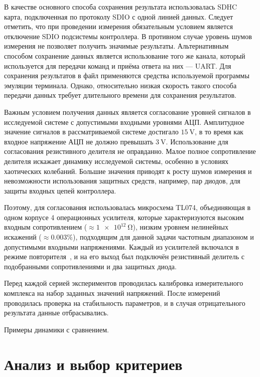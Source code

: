 В качестве основного способа сохранения результата
использовалась SDHC карта, подключенная по протоколу SDIO с одной линией данных.
Следует отметить, что при проведении измерения обязательным условием
является отключение SDIO подсистемы контроллера.
В противном случае уровень шумов измерения не позволяет
получить значимые результаты.
Альтернативным способом сохранение данных является
использование того же канала, который используется для передачи команд
и приёма ответа на них --- UART. Для сохранения результатов в файл
применяются средства используемой программы эмуляции терминала.
Однако, относительно низкая скорость такого способа передачи данных
требует длительного времени для сохранения результатов.

Важным условием получения данных является согласование уровней
сигналов в исследуемой системе с допустимыми входными уровнями АЦП.
Амплитудное значение сигналов в рассматриваемой системе достигало
$\SI{15}{\volt}$, в то время как входное напряжение АЦП не должно
превышать $\SI{3}{\volt}$.
Использование для согласования резистивного делителя
не оправданно. Малое полное сопротивление делителя
искажает динамику исследуемой системы, особенно в условиях
хаотических колебаний. Большие значения приводят
к росту шумов измерения и невозможности
использования защитных средств, например, пар диодов,
для защиты входных цепей контроллера.

Поэтому, для согласования использовалась микросхема TL074,
объединяющая в одном корпусе 4 операционных усилителя,
которые характеризуются высоким входным сопротивлением ($\approx \SI{1e12}{\ohm}$),
низким уровнем нелинейных искажений ($\approx 0.003\%$),
подходящим для данной задачи частотным диапазоном
и допустимыми входными напряжениями.
Каждый из усилителей включался в режиме повторителя~\cite{horowitz},
и на его выход был подключён резистивный делитель
с подобранными сопротивлениями и два защитных диода.

Перед каждой серией экспериментов проводилась калибровка
измерительного комплекса на набор заданных значений напряжений.
После измерений проводилась проверка на стабильность
параметров, и в случая отрицательного результата
данные отбрасывались.


Примеры динамики с сравнением.


\section{Анализ и выбор критериев}  %

